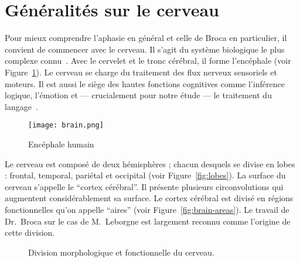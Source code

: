\section{Généralités sur le cerveau}

Pour mieux comprendre l'aphasie en général et celle de Broca en particulier, 
il convient de commencer avec le cerveau.
Il s'agit du système biologique le plus complexe connu~\cite{}.
Avec le cervelet et le tronc cérébral, il forme l'encéphale (voir Figure~\ref{fig:brain}).
Le cerveau se charge du traitement des flux nerveux sensoriels et moteurs.
Il est aussi le siège des hautes fonctions cognitives comme l'inférence logique, l'émotion 
et --- crucialement pour notre étude --- le traitement du langage~\cite{}.

\begin{figure}[htb]
    \begin{center}
        \texttt{[image: brain.png]}
    \end{center}
    \caption{Encéphale humain}
    \label{fig:brain}
\end{figure}

Le cerveau est composé de deux hémisphères ; chacun desquels se divise en lobes : 
frontal, temporal, pariétal et occipital (voir Figure~\ref{fig:lobes}).
La surface du cerveau s'appelle le ``cortex cérébral''.
Il présente plusieurs circonvolutions qui augmentent considérablement sa surface.
Le cortex cérébral est divisé en régions fonctionnelles qu'on appelle ``aires'' 
(voir Figure~\ref{fig:brain-areas}).
Le travail de Dr.~Broca sur le cas de M.~Leborgne est largement reconnu comme l'origine de cette division.


\begin{figure}[htb]
    \begin{center}
    \end{center}
    \caption{Division morphologique et fonctionnelle du cerveau.}
\end{figure}


